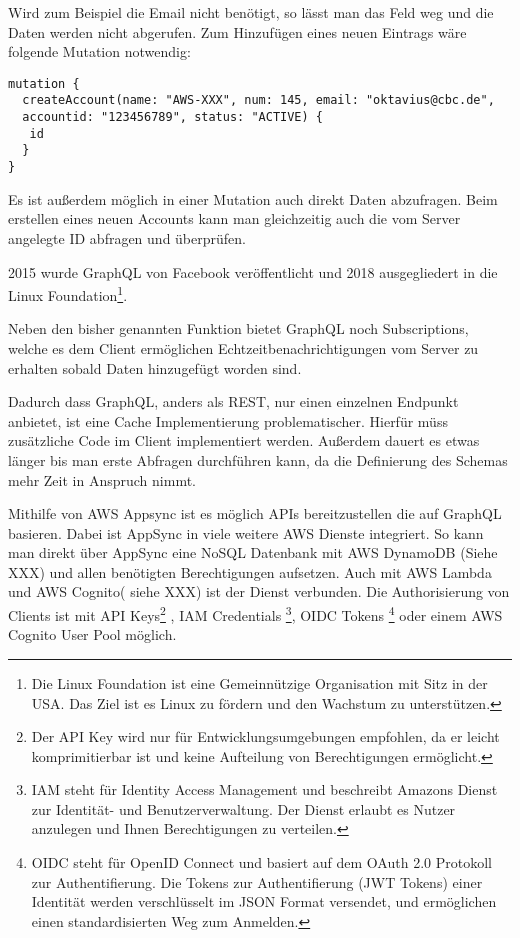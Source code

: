 Wird zum Beispiel die Email nicht benötigt, so lässt man das Feld weg und die Daten werden nicht abgerufen.
Zum Hinzufügen eines neuen Eintrags wäre folgende Mutation notwendig:
\begin{lstlisting}
mutation {
  createAccount(name: "AWS-XXX", num: 145, email: "oktavius@cbc.de",
  accountid: "123456789", status: "ACTIVE) {
   id
  }
}
\end{lstlisting}

Es ist außerdem möglich in einer Mutation auch direkt Daten abzufragen. Beim erstellen eines neuen Accounts kann man gleichzeitig auch die
vom Server angelegte ID abfragen und überprüfen.

2015 wurde GraphQL von Facebook veröffentlicht und 2018 ausgegliedert in die Linux Foundation\footnote{Die Linux Foundation ist eine Gemeinnützige Organisation mit Sitz in der USA.
Das Ziel ist es Linux zu fördern und den Wachstum zu unterstützen.}.

Neben den bisher genannten Funktion bietet GraphQL noch Subscriptions, welche es dem Client ermöglichen Echtzeitbenachrichtigungen vom Server zu erhalten sobald
Daten hinzugefügt worden sind.

Dadurch dass GraphQL, anders als REST, nur einen einzelnen Endpunkt anbietet, ist eine Cache Implementierung problematischer. Hierfür müss
zusätzliche Code im Client implementiert werden. Außerdem dauert es etwas länger bis man erste Abfragen durchführen kann, da die Definierung des
Schemas mehr Zeit in Anspruch nimmt. \cite[]{GraphQL} \cite[]{GraphQL1}

Mithilfe von AWS Appsync ist es möglich APIs bereitzustellen die auf GraphQL basieren. Dabei ist AppSync in viele weitere AWS Dienste integriert.
So kann man direkt über AppSync eine NoSQL Datenbank mit AWS DynamoDB (Siehe XXX) und allen benötigten Berechtigungen aufsetzen. Auch mit AWS Lambda
und AWS Cognito( siehe XXX) ist der Dienst verbunden. Die Authorisierung von Clients ist mit API Keys\footnote{Der API Key wird nur für Entwicklungsumgebungen empfohlen,
da er leicht komprimitierbar ist und keine Aufteilung von Berechtigungen ermöglicht.}
, IAM Credentials \footnote{
    IAM steht für Identity Access Management und beschreibt Amazons Dienst zur Identität- und Benutzerverwaltung. Der Dienst erlaubt es Nutzer anzulegen und
    Ihnen Berechtigungen zu verteilen.}, OIDC Tokens \footnote{OIDC steht für OpenID Connect und basiert auf dem OAuth 2.0 Protokoll zur Authentifierung.
    Die Tokens zur Authentifierung (JWT Tokens) einer Identität werden verschlüsselt im JSON Format versendet, und ermöglichen einen standardisierten Weg zum Anmelden.
          } oder einem AWS
Cognito User Pool möglich. \cite[]{AppSyncAuth}

